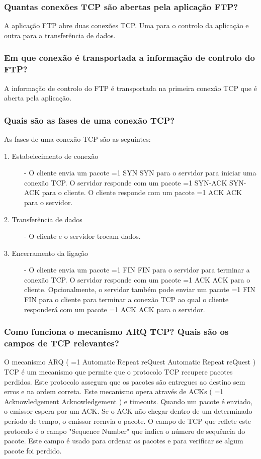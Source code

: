 \documentclass[11pt,a4paper]{article}
\newcommand{\hl}[2][1]{%
  \ifnum#1=1\relax
    \textcolor{text-hl1}{#2}%
  \else
    \textcolor{text-hl2}{#2}%
  \fi
}
\begin{document}
\begin{multicols}{2}
\subsubsection{Quantas conexões TCP são abertas pela aplicação FTP?}

A aplicação FTP abre duas conexões TCP. Uma para o controlo da aplicação e outra para a transferência de dados.

\subsubsection{Em que conexão é transportada a informação de controlo do FTP?}

A informação de controlo do FTP é transportada na primeira conexão TCP que é aberta pela aplicação.

\subsubsection{Quais são as fases de uma conexão TCP?}

As fases de uma conexão TCP são as seguintes:
\begin{description}
    \item[1. Estabelecimento de conexão] - O cliente envia um pacote \hl{SYN} para o servidor para iniciar uma conexão TCP. O servidor responde com um pacote \hl{SYN-ACK} para o cliente. O cliente responde com um pacote \hl{ACK} para o servidor.
    \item[2. Transferência de dados] - O cliente e o servidor trocam dados.
    \item[3. Encerramento da ligação] - O cliente envia um pacote \hl{FIN} para o servidor para terminar a conexão TCP. O servidor responde com um pacote \hl{ACK} para o cliente. Opcionalmente, o servidor também pode enviar um pacote \hl{FIN} para o cliente para terminar a conexão TCP ao qual o cliente responderá com um pacote \hl{ACK} para o servidor. 
\end{description}

\subsubsection{Como funciona o mecanismo ARQ TCP? Quais são os campos de TCP relevantes?}

O mecanismo ARQ (\hl{Automatic Repeat reQuest}) TCP é um mecanismo que permite que o protocolo TCP recupere pacotes perdidos. Este protocolo assegura que os pacotes são entregues ao destino sem erros e na ordem correta. Este mecanismo opera através de ACKs (\hl[2]{Acknowledgement}) e timeouts. Quando um pacote é enviado, o emissor espera por um ACK. Se o ACK não chegar dentro de um determinado período de tempo, o emissor reenvia o pacote.
O campo de TCP que reflete este protocolo é o campo "Sequence Number" que indica o número de sequência do pacote. Este campo é usado para ordenar os pacotes e para verificar se algum pacote foi perdido. 


\end{multicols}
\end{document}
